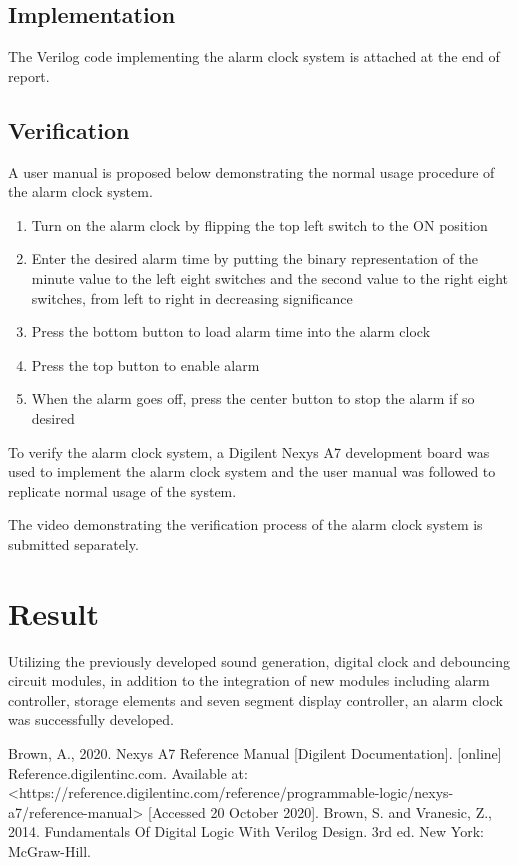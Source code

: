 \documentclass[conference]{IEEEtran}
\begin{document}
\subsection{Implementation}
The Verilog code implementing the alarm clock system is attached at the end of report.

\subsection{Verification}
A user manual is proposed below demonstrating the normal usage procedure of the alarm clock system.

\begin{enumerate}
    \item Turn on the alarm clock by flipping the top left switch to the ON position
    \item Enter the desired alarm time by putting the binary representation of the minute value to the left eight switches and the second value to the right eight switches, from left to right in decreasing significance
    \item Press the bottom button to load alarm time into the alarm clock
    \item Press the top button to enable alarm
    \item When the alarm goes off, press the center button to stop the alarm if so desired 
\end{enumerate}

To verify the alarm clock system, a Digilent Nexys A7 development board was used to implement the alarm clock system and the user manual was followed to replicate normal usage of the system.

The video demonstrating the verification process of the alarm clock system is submitted separately.

\section{Result}
Utilizing the previously developed sound generation, digital clock and debouncing circuit modules, in addition to the integration of new modules including alarm controller, storage elements and seven segment display controller, an alarm clock was successfully developed.

\begin{thebibliography}{00}
 Brown, A., 2020. Nexys A7 Reference Manual [Digilent Documentation]. [online] Reference.digilentinc.com. Available at: <https://reference.digilentinc.com/reference/programmable-logic/nexys-a7/reference-manual> [Accessed 20 October 2020].
 Brown, S. and Vranesic, Z., 2014. Fundamentals Of Digital Logic With Verilog Design. 3rd ed. New York: McGraw-Hill. 
\end{thebibliography}
\end{document}
